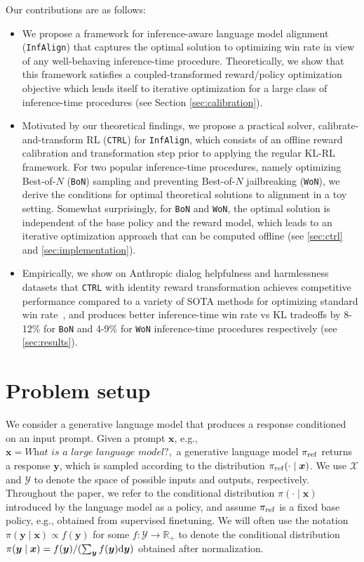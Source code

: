 \documentclass{article}
\makeatletter
\newcommand{\by}{{\bm{y}}}
\newcommand{\bx}{{\bm{x}}}
\newcommand{\bcX}{{\bm{\mathcal{X}}}}
\newcommand{\bcY}{{\bm{\mathcal{Y}}}}
\newcommand{\dd}{{\rm d}}
\newcommand{\bp}{{\pi_{\rm ref}}} %
\newcommand{\iapo}{\texttt{InfAlign}\xspace}
\newcommand{\ctrl}{\texttt{CTRL}\xspace}
\newcommand{\RR}{\mathbb{R}}
\newcommand{\bofn}{\texttt{BoN}\xspace}
\newcommand{\wofn}{\texttt{WoN}\xspace}
\newcommand{\eg}{e.g.\@\xspace}
\makeatother
\begin{document}
Our contributions are as follows:
%
%
\begin{itemize}
   \item We propose a framework for inference-aware language model alignment (\iapo) that captures the optimal solution to optimizing win rate in view of any well-behaving inference-time procedure. Theoretically, we show that this framework satisfies a coupled-transformed reward/policy optimization objective which lends itself to iterative optimization for a large class of inference-time procedures (see Section \ref{sec:calibration}).
    \item Motivated by our theoretical findings, we propose a practical solver, calibrate-and-transform RL (\ctrl) for \iapo, which consists of an offline reward calibration and transformation step prior to applying the regular KL-RL framework. For two popular inference-time procedures, namely optimizing Best-of-$N$ (\bofn) sampling and preventing Best-of-$N$ jailbreaking (\wofn), we derive the conditions for optimal theoretical solutions to alignment in a toy setting. Somewhat surprisingly, for \bofn and \wofn, the optimal solution is independent of the base policy and the reward model, which leads to an iterative optimization approach that can be computed offline (see \cref{sec:ctrl} and \cref{sec:implementation}).
    \item 
    Empirically, we show on Anthropic dialog helpfulness and harmlessness datasets that \ctrl with identity reward transformation achieves competitive performance compared to a variety of SOTA methods for optimizing standard win rate~\citep{gui2024bonbonalignmentlargelanguage, amini2024variationalbestofnalignment, sessa2024bondaligningllmsbestofn, azar2023general, rafailov2024direct}, and produces
    better inference-time win rate vs KL tradeoffs by 8-12\% for \bofn and 4-9\% for \wofn inference-time procedures respectively (see  \cref{sec:results}).
\end{itemize}






\section{Problem setup} \label{sec:setup}
%

We consider a generative language model that produces a response conditioned on an input prompt. %
%
Given a prompt $\bx$, \eg, $\bx = \textit{What is a large language model?},$ a generative language model $\bp$ returns a response $\by$,  which is sampled according to the distribution $\bp(\cdot \mid \bx)$. We use $\bcX$ and $\bcY$ to denote the space of possible inputs and outputs, respectively. Throughout the paper, we refer to the conditional distribution $\pi(\cdot \mid \bx)$ introduced by the language model as a policy, and assume $\bp$ is a fixed base policy, \eg, obtained from supervised finetuning. We will often use the notation $\pi(\by \mid \bx) \propto f(\by)$ for some $f: \bcY \rightarrow \RR_+$ to denote the conditional distribution $\pi(\by \mid \bx) = f(\by)/(\sum_{\by}f(\by)\dd\by)$ obtained after normalization.
%
%
\end{document}
